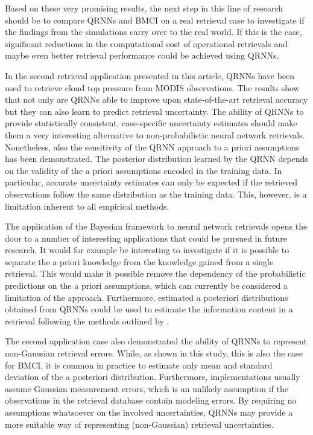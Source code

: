 \documentclass[journal abbreviation, manuscript]{copernicus}
\begin{document}
Based on these very promising results, the next step in this line of research
should be to compare QRNNs and BMCI on a real retrieval case to investigate if
the findings from the simulations carry over to the real world. If this is the
case, significant reductions in the computational cost of operational retrievals
and maybe even better retrieval performance could be achieved using QRNNs.

In the second retrieval application presented in this article, QRNNs have been
used to retrieve cloud top pressure from MODIS observations. The results show
that not only are QRNNs able to improve upon state-of-the-art retrieval accuracy
but they can also learn to predict retrieval uncertainty. The ability of QRNNs
to provide statistically consistent, case-specific uncertainty estimates should
make them a very interesting alternative to non-probabilistic neural network
retrievals. Nonetheless, also the sensitivity of the QRNN approach to a priori
assumptions has been demonstrated. The posterior distribution learned by the
QRNN depends on the validity of the a priori assumptions encoded in the training
data. In particular, accurate uncertainty estimates can only be expected if the
retrieved observations follow the same distribution as the training data. This,
however, is a limitation inherent to all empirical methods.

The application of the Bayesian framework to neural network retrievals opens
the door to a number of interesting applications that could be pursued in future
research. It would for example be interesting to investigate if it is possible
to separate the a priori knowledge from the knowledge gained from a single
retrieval. This would make it possible remove the dependency of the
probabilistic predictions on the a priori assumptions, which can currently be
considered a limitation of the approach. Furthermore, estimated a posteriori
distributions obtained from QRNNs could be used to estimate the information
content in a retrieval following the methods outlined by \citet{rodgers}.

The second application case also demonstrated the ability of QRNNs to represent
non-Gaussian retrieval errors. While, as shown in this study, this is also the case
for BMCI, it is common in practice to estimate only mean and standard
deviation of the a posteriori distribution. Furthermore, implementations usually
assume Gaussian measurement errors, which is an unlikely assumption if the
observations in the retrieval database contain modeling errors. By requiring no
assumptions whatsoever on the involved uncertainties, QRNNs may provide a more
suitable way of representing (non-Gaussian) retrieval uncertainties.
\end{document}
